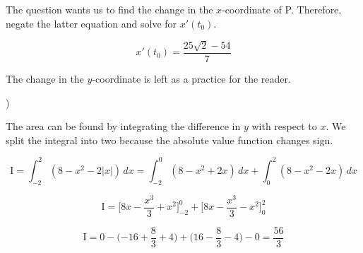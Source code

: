 \documentclass{article}
\begin{document}
\hfill

\noindent The question wants us to find the change in the $x$-coordinate of P. Therefore, negate the latter equation and solve for $x'(t_0)$.

\begin{equation*} \boxed{x'(t_0) = \frac{25\sqrt{2}-54}{7}} \end{equation*}

\hfill

\noindent The change in the $y$-coordinate is left as a practice for the reader.

\hfill

)

\begin{center}
\end{center}

\noindent The area can be found by integrating the difference in $y$ with respect to $x$. We split the integral into two because the absolute value function changes sign.

\begin{equation*}\text{I} = \int_{-2}^2 (8-x^2-2|x|)\,dx = \int_{-2}^0 (8-x^2+2x)\,dx + \int_{0}^2 (8-x^2 - 2x)\,dx\end{equation*}

\begin{equation*}\text{I} = \Bigg[8x-\frac{x^3}{3} + x^2 \Bigg]_{-2}^0 + \Bigg[8x-\frac{x^3}{3} - x^2 \Bigg]_{0}^2\end{equation*}

\begin{equation*}\text{I} = 0 - \Big({-16} + \frac{8}{3} + 4\Big) + \Big(16 - \frac{8}{3} - 4\Big) - 0 = \boxed{\frac{56}{3}}\end{equation*}
\end{document}
